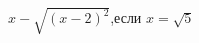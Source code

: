 \begin{ex}[type=calculate_expression]
	\begin{condition}
		\(  x-\sqrt{(x-2)^2} \),\quad если \( x=\sqrt{5} \)
	\end{condition}
\end{ex}